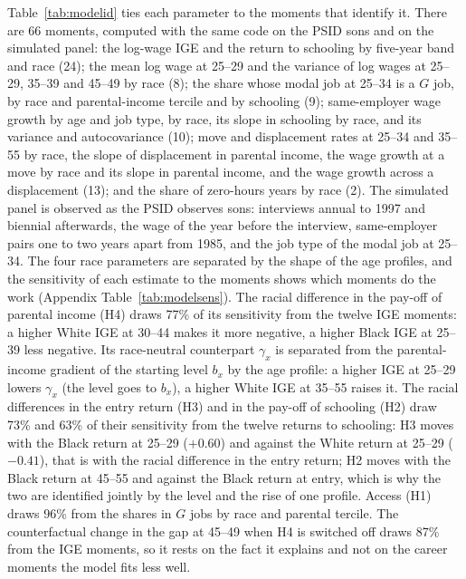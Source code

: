 Table~\ref{tab:modelid} ties each parameter to the moments that identify it. There are 66 moments, computed with the
same code on the PSID sons and on the simulated panel: the log-wage IGE and the return to schooling by five-year band
and race (24); the mean log wage at 25--29 and the variance of log wages at 25--29, 35--39 and 45--49 by race (8); the
share whose modal job at 25--34 is a $G$ job, by race and parental-income tercile and by schooling (9); same-employer
wage growth by age and job type, by race, its slope in schooling by race, and its variance and autocovariance (10); move
and displacement rates at 25--34 and 35--55 by race, the slope of displacement in parental income, the wage growth at a
move by race and its slope in parental income, and the wage growth across a displacement (13); and the share of
zero-hours years by race (2). The simulated panel is observed as the PSID observes sons: interviews annual to 1997 and
biennial afterwards, the wage of the year before the interview, same-employer pairs one to two years apart from 1985,
and the job type of the modal job at 25--34. The four race parameters are separated by the shape of the age profiles, and the
sensitivity of each estimate to the moments \citep{andrews2017measuring} shows which moments do the work
(Appendix Table~\ref{tab:modelsens}). The racial difference in the pay-off of parental income (H4) draws 77\% of its
sensitivity from the twelve IGE moments: a higher White IGE at 30--44 makes it more negative, a higher Black IGE at
25--39 less negative. Its race-neutral counterpart $\gamma_x$ is separated from the parental-income gradient of the
starting level $b_x$ by the age profile: a higher IGE at 25--29 lowers $\gamma_x$ (the level goes to $b_x$), a higher
White IGE at 35--55 raises it. The racial differences in the entry return (H3) and in the pay-off of schooling (H2) draw
73\% and 63\% of their sensitivity from the twelve returns to schooling: H3 moves with the Black return at 25--29 ($+0.60$) and against the White return at 25--29 ($-0.41$), that
is with the racial difference in the entry return; H2 moves with the Black return at 45--55 and against the Black return
at entry, which is why the two are identified
jointly by the level and the rise of one profile. Access (H1) draws 96\% from the shares in $G$ jobs by race and
parental tercile. The counterfactual change in the gap at 45--49 when H4 is switched off draws 87\% from the IGE
moments, so it rests on the fact it explains and not on the career moments the model fits less well.

